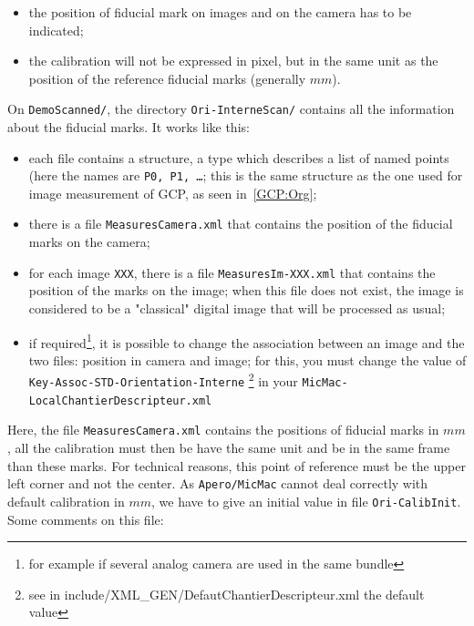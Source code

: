 \begin{itemize}
   \item the position of fiducial mark on images and on the camera has to be indicated;
   \item the calibration will not be expressed in pixel, but in the same unit
         as the position of the reference fiducial marks (generally $mm$).
\end{itemize}

On {\tt DemoScanned/}, the directory {\tt Ori-InterneScan/} contains all the information
about the fiducial marks. It works like this:

\begin{itemize}
    \item each file contains a structure, a type {\tt <MesureAppuiFlottant1Im>} which describes a list
          of named points (here the names are {\tt P0, P1, \dots}; this is the same structure as the one used
          for image measurement of GCP, as seen in~\ref{GCP:Org};

     \item there is a file {\tt MeasuresCamera.xml} that contains the position of the fiducial marks
          on the camera;

     \item for each image {\tt XXX}, there is a file {\tt MeasuresIm-XXX.xml} that contains the position
           of the marks on the image; when this file does not exist, the image is considered to be a "classical"
           digital image that will be processed as usual;

     \item if required\footnote{for example if several analog camera are used in the same bundle},
           it is possible to change the association between an image and the two files: position in camera
           and image; for this, you must change the  value of {\tt Key-Assoc-STD-Orientation-Interne}
           \footnote{see in include/XML\_GEN/DefautChantierDescripteur.xml the default value}
           in your {\tt MicMac-LocalChantierDescripteur.xml}
\end{itemize}

Here, the file {\tt MeasuresCamera.xml} contains the positions of fiducial marks in $mm$,
all the calibration  must then be have the same unit and be in the same frame than these
marks. For technical reasons, this point of reference must be the upper left corner and not the center.
As {\tt Apero/MicMac} cannot deal correctly with default calibration in $mm$, we
have to give an initial value in file {\tt Ori-CalibInit}. Some comments on this file:

